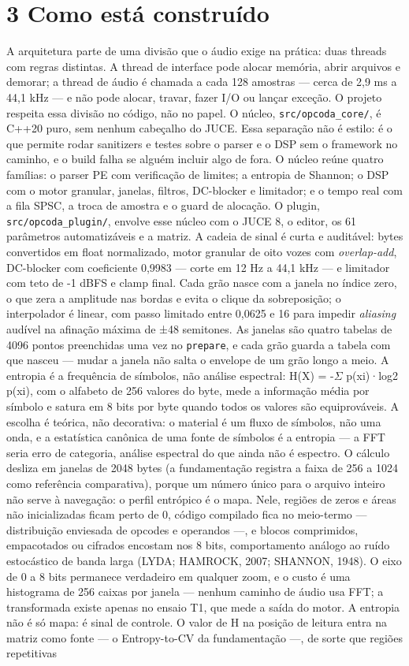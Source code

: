 \documentclass[11pt,a4paper]{article}
\newcommand{\code}[1]{\texttt{\small #1}}
\begin{document}
\section*{3 Como está construído}
A arquitetura parte de uma divisão que o áudio exige na prática: duas threads com regras distintas. A thread de interface pode alocar memória, abrir arquivos e demorar; a thread de áudio é chamada a cada 128 amostras --- cerca de 2,9 ms a 44,1 kHz --- e não pode alocar, travar, fazer I/O ou lançar exceção. O projeto respeita essa divisão no código, não no papel. O núcleo, \code{src/opcoda\_core/}, é C++20 puro, sem nenhum cabeçalho do JUCE. Essa separação não é estilo: é o que permite rodar sanitizers e testes sobre o parser e o DSP sem o framework no caminho, e o build falha se alguém incluir algo de fora. O núcleo reúne quatro famílias: o parser PE com verificação de limites; a entropia de Shannon; o DSP com o motor granular, janelas, filtros, DC-blocker e limitador; e o tempo real com a fila SPSC, a troca de amostra e o guard de alocação. O plugin, \code{src/opcoda\_plugin/}, envolve esse núcleo com o JUCE 8, o editor, os 61 parâmetros automatizáveis e a matriz. A cadeia de sinal é curta e auditável: bytes convertidos em float normalizado, motor granular de oito vozes com \emph{overlap-add}, DC-blocker com coeficiente 0,9983 --- corte em 12 Hz a 44,1 kHz --- e limitador com teto de -1 dBFS e clamp final. Cada grão nasce com a janela no índice zero, o que zera a amplitude nas bordas e evita o clique da sobreposição; o interpolador é linear, com passo limitado entre 0,0625 e 16 para impedir \emph{aliasing} audível na afinação máxima de ±48 semitones. As janelas são quatro tabelas de 4096 pontos preenchidas uma vez no \code{prepare}, e cada grão guarda a tabela com que nasceu --- mudar a janela não salta o envelope de um grão longo a meio. A entropia é a frequência de símbolos, não análise espectral: H(X) = -\(\Sigma\) p(xi)·log2 p(xi), com o alfabeto de 256 valores do byte, mede a informação média por símbolo e satura em 8 bits por byte quando todos os valores são equiprováveis. A escolha é teórica, não decorativa: o material é um fluxo de símbolos, não uma onda, e a estatística canônica de uma fonte de símbolos é a entropia --- a FFT seria erro de categoria, análise espectral do que ainda não é espectro. O cálculo desliza em janelas de 2048 bytes (a fundamentação registra a faixa de 256 a 1024 como referência comparativa), porque um número único para o arquivo inteiro não serve à navegação: o perfil entrópico é o mapa. Nele, regiões de zeros e áreas não inicializadas ficam perto de 0, código compilado fica no meio-termo --- distribuição enviesada de opcodes e operandos ---, e blocos comprimidos, empacotados ou cifrados encostam nos 8 bits, comportamento análogo ao ruído estocástico de banda larga (LYDA; HAMROCK, 2007; SHANNON, 1948). O eixo de 0 a 8 bits permanece verdadeiro em qualquer zoom, e o custo é uma histograma de 256 caixas por janela --- nenhum caminho de áudio usa FFT; a transformada existe apenas no ensaio T1, que mede a saída do motor. A entropia não é só mapa: é sinal de controle. O valor de H na posição de leitura entra na matriz como fonte --- o Entropy-to-CV da fundamentação ---, de sorte que regiões repetitivas 
\end{document}
